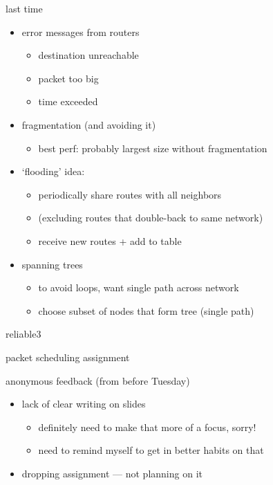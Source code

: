 \date{}
\title{}
\date{}

\begin{frame}
    \titlepage
\end{frame}

\begin{frame}{last time}
    \begin{itemize}
    \item error messages from routers
        \begin{itemize}
        \item destination unreachable
        \item packet too big
        \item time exceeded
        \end{itemize}
    \item fragmentation (and avoiding it)
        \begin{itemize}
        \item best perf: probably largest size without fragmentation
        \end{itemize}
    \item `flooding' idea:
        \begin{itemize}
        \item periodically share routes with all neighbors
        \item (excluding routes that double-back to same network)
        \item receive new routes + add to table
        \end{itemize}
    \item spanning trees
        \begin{itemize}
        \item to avoid loops, want single path across network
        \item choose subset of nodes that form tree (single path)
        \end{itemize}
    \end{itemize}
\end{frame}

\begin{frame}{reliable3}
\end{frame}

\begin{frame}{packet scheduling assignment}
\end{frame}

\begin{frame}{anonymous feedback (from before Tuesday)}
    \begin{itemize}
    \item lack of clear writing on slides
        \begin{itemize}
        \item definitely need to make that more of a focus, sorry!
        \item need to remind myself to get in better habits on that
        \end{itemize}
    \item dropping assignment --- not planning on it
    \end{itemize}
\end{frame}

